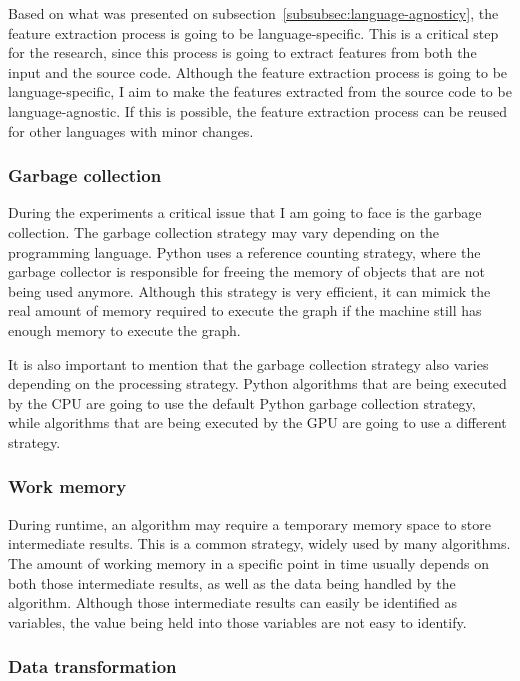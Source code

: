 Based on what was presented on subsection~\ref{subsubsec:language-agnosticy}, the feature extraction process is going to be language-specific.
This is a critical step for the research, since this process is going to extract features from both the input and the source code.
Although the feature extraction process is going to be language-specific, I aim to make the features extracted from the source code to be language-agnostic.
If this is possible, the feature extraction process can be reused for other languages with minor changes.

\subsubsection{Garbage collection}

During the experiments a critical issue that I am going to face is the garbage collection.
The garbage collection strategy may vary depending on the programming language.
Python uses a reference counting strategy, where the garbage collector is responsible for freeing the memory of objects that are not being used anymore.
Although this strategy is very efficient, it can mimick the real amount of memory required to execute the graph if the machine still has enough memory to execute the graph.

It is also important to mention that the garbage collection strategy also varies depending on the processing strategy.
Python algorithms that are being executed by the CPU are going to use the default Python garbage collection strategy, while algorithms that are being executed by the GPU are going to use a different strategy.

\subsubsection{Work memory}

During runtime, an algorithm may require a temporary memory space to store intermediate results.
This is a common strategy, widely used by many algorithms.
The amount of working memory in a specific point in time usually depends on both those intermediate results, as well as the data being handled by the algorithm.
Although those intermediate results can easily be identified as variables, the value being held into those variables are not easy to identify.

\subsubsection{Data transformation}

